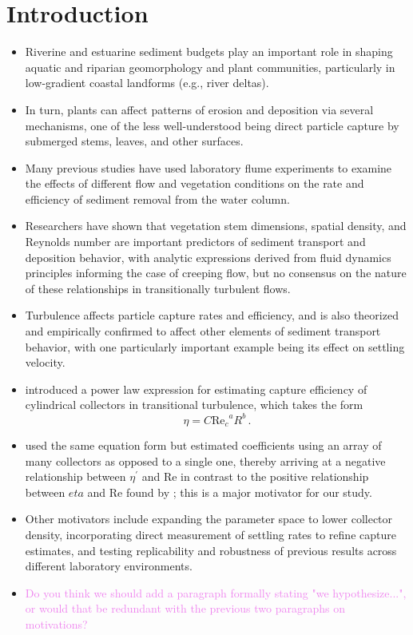 \documentclass{article}
\newcommand\Rey{\mathrm{Re}}
\begin{document}
\section{Introduction}

\begin{itemize}
    \item Riverine and estuarine sediment budgets play an important role in shaping aquatic and riparian geomorphology and plant communities, particularly in low-gradient coastal landforms (e.g., river deltas).
    \item In turn, plants can affect patterns of erosion and deposition via several mechanisms, one of the less well-understood being direct particle capture by submerged stems, leaves, and other surfaces. 
    \item Many previous studies have used laboratory flume experiments to examine the effects of different flow and vegetation conditions on the rate and efficiency of sediment removal from the water column.
    \item Researchers have shown that vegetation stem dimensions, spatial density, and Reynolds number are important predictors of sediment transport and deposition behavior, with analytic expressions derived from fluid dynamics principles informing the case of creeping flow, but no consensus on the nature of these relationships in transitionally turbulent flows. 
    \item Turbulence affects particle capture rates and efficiency, and is also theorized and empirically confirmed to affect other elements of sediment transport behavior, with one particularly important example being its effect on settling velocity.
    \item \cite{Palmer_2004} introduced a power law expression for estimating capture efficiency of cylindrical collectors in transitional turbulence, which takes the form 
        \begin{equation}
            \eta=C{\Rey_c}^{a}R^{b}\,.
            \label{eq:powerlaw}
        \end{equation}
    \item \cite{Fauria_2015} used the same equation form but estimated coefficients using an array of many collectors as opposed to a single one, thereby arriving at a negative relationship between $\eta^\prime$ and $\Rey$ in contrast to the positive relationship between $eta$ and $\Rey$ found by \cite{Palmer_2004}; this is a major motivator for our study. 
    \item Other motivators include expanding the parameter space to lower collector density, incorporating direct measurement of settling rates to refine capture estimates, and testing replicability and robustness of previous results across different laboratory environments.
    \item \textcolor{violet}{Do you think we should add a paragraph formally stating "we hypothesize...", or would that be redundant with the previous two paragraphs on motivations?}
\end{itemize}
\end{document}
